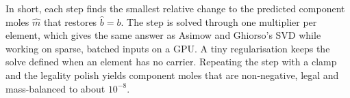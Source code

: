 \documentclass[11pt]{article}
\begin{document}
In short, each step finds the smallest relative change to the predicted component moles
$\hat m$ that restores $\hat b = b$. The step is solved through one multiplier per element,
which gives the same answer as Asimow and Ghiorso's SVD while working on sparse, batched
inputs on a GPU. A tiny regularisation keeps the solve defined when an element has no
carrier. Repeating the step with a clamp and the legality polish yields component moles that
are non-negative, legal and mass-balanced to about $10^{-8}$.
\end{document}

